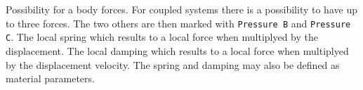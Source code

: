 \sifbegin
{}
Possibility for a body forces. For coupled systems there is a 
possibility to have up to three forces. The two others are then
marked with \texttt{Pressure B} and \texttt{Pressure C}.
The local spring which results to a local force when multiplyed
by the displacement.
The local damping which results to a local force when multiplyed
by the displacement velocity. The spring and damping may also be 
defined as material parameters.
\sifend

\sifend

